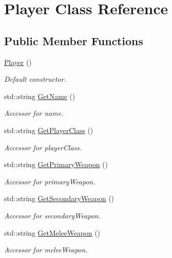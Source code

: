 \hypertarget{class_player}{}\section{Player Class Reference}
\label{class_player}
\subsection*{Public Member Functions}
\begin{DoxyCompactItemize}
\item 
\hyperlink{class_player_affe0cc3cb714f6deb4e62f0c0d3f1fd8}{Player} ()
\begin{DoxyCompactList}\small\item\em Default constructor. \end{DoxyCompactList}\item 
std\+::string \hyperlink{class_player_a750a1ec83c75a616483d385276bc54ad}{Get\+Name} ()
\begin{DoxyCompactList}\small\item\em Accessor for name. \end{DoxyCompactList}\item 
std\+::string \hyperlink{class_player_a3e597313a3b09c9179b1d266c6af9b6c}{Get\+Player\+Class} ()
\begin{DoxyCompactList}\small\item\em Accessor for player\+Class. \end{DoxyCompactList}\item 
std\+::string \hyperlink{class_player_add74ab4ef4c898482a343b5419f79c2b}{Get\+Primary\+Weapon} ()
\begin{DoxyCompactList}\small\item\em Accessor for primary\+Weapon. \end{DoxyCompactList}\item 
std\+::string \hyperlink{class_player_a244325aa5d3dd56a538e5bfdb9525da8}{Get\+Secondary\+Weapon} ()
\begin{DoxyCompactList}\small\item\em Accessor for secondary\+Weapon. \end{DoxyCompactList}\item 
std\+::string \hyperlink{class_player_a4e253291862ccbb9a0dded751e3298a7}{Get\+Melee\+Weapon} ()
\begin{DoxyCompactList}\small\item\em Accessor for melee\+Weapon. \end{DoxyCompactList}\item 

\end{DoxyCompactItemize}
